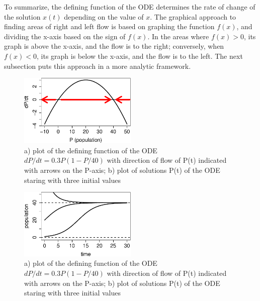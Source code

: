 \documentclass[
  letterpaper,
  DIV=11,
  numbers=noendperiod]{scrreprt}
\begin{document}
To summarize, the defining function of the ODE determines the rate of
change of the solution \(x(t)\) depending on the value of \(x\). The
graphical approach to finding areas of right and left flow is based on
graphing the function \(f(x)\), and dividing the x-axis based on the
sign of \(f(x)\). In the areas where \(f(x) > 0\), its graph is above
the x-axis, and the flow is to the right; conversely, when \(f(x) < 0\),
its graph is below the x-axis, and the flow is to the left. The next
subsection puts this approach in a more analytic framework.

\begin{figure}

{\centering \includegraphics[width=0.5\textwidth,height=\textheight]{./graph_odes_files/figure-pdf/ch7-flow2-1.pdf}

}

\caption{a) plot of the defining function of the ODE
\(dP/dt = 0.3P(1-P/40)\) with direction of flow of P(t) indicated with
arrows on the P-axis; b) plot of solutions P(t) of the ODE staring with
three initial values}

\end{figure}

\begin{figure}

{\centering \includegraphics[width=0.5\textwidth,height=\textheight]{./graph_odes_files/figure-pdf/ch7-flow2-2.pdf}

}

\caption{a) plot of the defining function of the ODE
\(dP/dt = 0.3P(1-P/40)\) with direction of flow of P(t) indicated with
arrows on the P-axis; b) plot of solutions P(t) of the ODE staring with
three initial values}

\end{figure}
\end{document}
